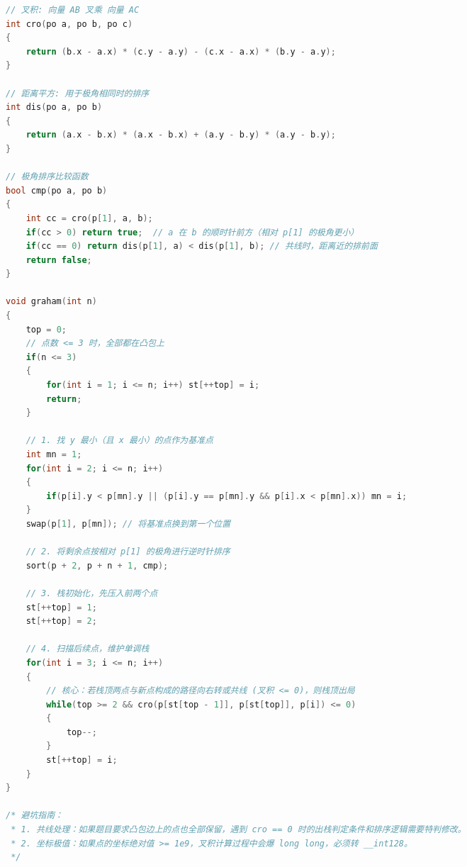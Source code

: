 \documentclass[10pt,landscape,a4paper]{article}
\begin{document}
\begin{multicols*}{3}
\begin{lstlisting}[language=C++]
// 叉积: 向量 AB 叉乘 向量 AC
int cro(po a, po b, po c)
{
    return (b.x - a.x) * (c.y - a.y) - (c.x - a.x) * (b.y - a.y);
}

// 距离平方: 用于极角相同时的排序
int dis(po a, po b)
{
    return (a.x - b.x) * (a.x - b.x) + (a.y - b.y) * (a.y - b.y);
}

// 极角排序比较函数
bool cmp(po a, po b)
{
    int cc = cro(p[1], a, b);
    if(cc > 0) return true;  // a 在 b 的顺时针前方（相对 p[1] 的极角更小）
    if(cc == 0) return dis(p[1], a) < dis(p[1], b); // 共线时，距离近的排前面
    return false;
}

void graham(int n)
{
    top = 0;
    // 点数 <= 3 时，全部都在凸包上
    if(n <= 3)
    {
        for(int i = 1; i <= n; i++) st[++top] = i;
        return;
    }
    
    // 1. 找 y 最小（且 x 最小）的点作为基准点
    int mn = 1;
    for(int i = 2; i <= n; i++)
    {
        if(p[i].y < p[mn].y || (p[i].y == p[mn].y && p[i].x < p[mn].x)) mn = i;
    }
    swap(p[1], p[mn]); // 将基准点换到第一个位置
    
    // 2. 将剩余点按相对 p[1] 的极角进行逆时针排序
    sort(p + 2, p + n + 1, cmp);
    
    // 3. 栈初始化，先压入前两个点
    st[++top] = 1;
    st[++top] = 2;
    
    // 4. 扫描后续点，维护单调栈
    for(int i = 3; i <= n; i++)
    {
        // 核心：若栈顶两点与新点构成的路径向右转或共线 (叉积 <= 0)，则栈顶出局
        while(top >= 2 && cro(p[st[top - 1]], p[st[top]], p[i]) <= 0)
        {
            top--;
        }
        st[++top] = i;
    }
}

/* 避坑指南：
 * 1. 共线处理：如果题目要求凸包边上的点也全部保留，遇到 cro == 0 时的出栈判定条件和排序逻辑需要特判修改。
 * 2. 坐标极值：如果点的坐标绝对值 >= 1e9，叉积计算过程中会爆 long long，必须转 __int128。
 */
\end{lstlisting}

\end{multicols*}
\end{document}
